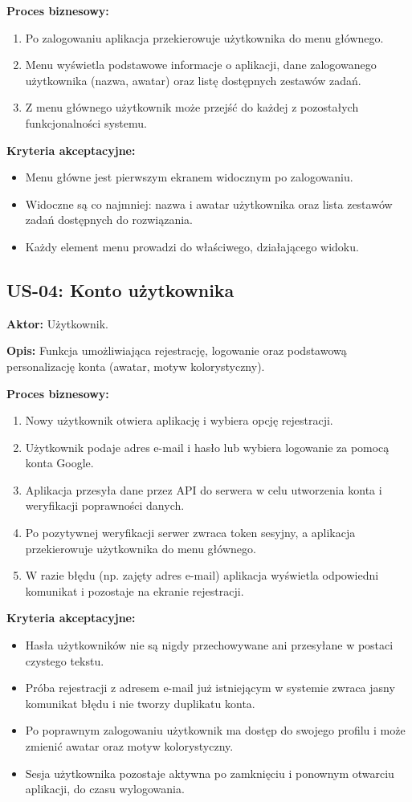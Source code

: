 \documentclass[polish]{aghengthesis}
\begin{document}
\textbf{Proces biznesowy:}
\begin{enumerate}
    \item Po zalogowaniu aplikacja przekierowuje użytkownika do menu
    głównego.
    \item Menu wyświetla podstawowe informacje o aplikacji, dane
    zalogowanego użytkownika (nazwa, awatar) oraz listę dostępnych
    zestawów zadań.
    \item Z menu głównego użytkownik może przejść do każdej z pozostałych
    funkcjonalności systemu.
\end{enumerate}

\textbf{Kryteria akceptacyjne:}
\begin{itemize}
    \item Menu główne jest pierwszym ekranem widocznym po zalogowaniu.
    \item Widoczne są co najmniej: nazwa i awatar użytkownika oraz lista
    zestawów zadań dostępnych do rozwiązania.
    \item Każdy element menu prowadzi do właściwego, działającego widoku.
\end{itemize}

\subsection{US-04: Konto użytkownika}
\textbf{Aktor:} Użytkownik.

\textbf{Opis:} Funkcja umożliwiająca rejestrację, logowanie oraz podstawową
personalizację konta (awatar, motyw kolorystyczny).

\textbf{Proces biznesowy:}
\begin{enumerate}
    \item Nowy użytkownik otwiera aplikację i wybiera opcję rejestracji.
    \item Użytkownik podaje adres e-mail i hasło lub wybiera logowanie za
    pomocą konta Google.
    \item Aplikacja przesyła dane przez API do serwera w celu utworzenia
    konta i weryfikacji poprawności danych.
    \item Po pozytywnej weryfikacji serwer zwraca token sesyjny, a aplikacja
    przekierowuje użytkownika do menu głównego.
    \item W razie błędu (np. zajęty adres e-mail) aplikacja wyświetla
    odpowiedni komunikat i pozostaje na ekranie rejestracji.
\end{enumerate}

\textbf{Kryteria akceptacyjne:}
\begin{itemize}
    \item Hasła użytkowników nie są nigdy przechowywane ani przesyłane
    w postaci czystego tekstu.
    \item Próba rejestracji z adresem e-mail już istniejącym w systemie
    zwraca jasny komunikat błędu i nie tworzy duplikatu konta.
    \item Po poprawnym zalogowaniu użytkownik ma dostęp do swojego profilu
    i może zmienić awatar oraz motyw kolorystyczny.
    \item Sesja użytkownika pozostaje aktywna po zamknięciu i ponownym
    otwarciu aplikacji, do czasu wylogowania.
\end{itemize}
\end{document}

